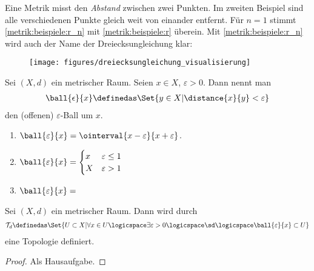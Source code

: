 Eine Metrik misst den \emph{Abstand} zwischen zwei Punkten. 
Im zweiten Beispiel sind alle verschiedenen Punkte gleich weit von einander entfernt. 
Für \( n=1 \) stimmt \ref{metrik:beispiele:r_n} mit \ref{metrik:beispiele:r} überein. 
Mit \ref{metrik:beispiele:r_n} wird auch der Name der Dreiecksungleichung klar:
\begin{figure}[H]
    \centering
    \texttt{[image: figures/dreiecksungleichung\_visualisierung]}
    \label{fig:dreiecksungleichung_visualisierung}
\end{figure}
\begin{definition}
    Sei \( (X,d) \) ein metrischer Raum. Seien \( x\in X \), \( \varepsilon>0 \). Dann nennt man
    \begin{align*}
        \ball{\epsilon}{x}\definedas\Set{y\in X| \distance{x}{y}<\varepsilon}
    \end{align*}
    den (offenen) \( \varepsilon \)-Ball um \( x \).
\end{definition}
\begin{beispiele*}
    \begin{enumerate}
        \item \( \ball{\varepsilon}{x}=\ointerval{x-\varepsilon}{x+\varepsilon} \).
        \item \( \ball{\varepsilon}{x}=\begin{cases}
            x & \varepsilon\leq 1 \\
            X & \varepsilon>1
        \end{cases}
         \)
         
        \item \( \ball{\varepsilon}{x}= \) 
        
    \end{enumerate}
\end{beispiele*}
\begin{satz}\label{metrische_topologie}
    Sei \( (X,d) \) ein metrischer Raum. Dann wird durch
    \begin{align*}
        \mathcal{T}_d\definedas \Set{U\subset X|\forall x\in U\logicspace\exists\varepsilon>0\logicspace\text{\sd}\logicspace \ball{\varepsilon}{x}\subset U}
    \end{align*}
    eine Topologie definiert.
\end{satz}
\begin{proof}
    Als Hausaufgabe.    
\end{proof}
